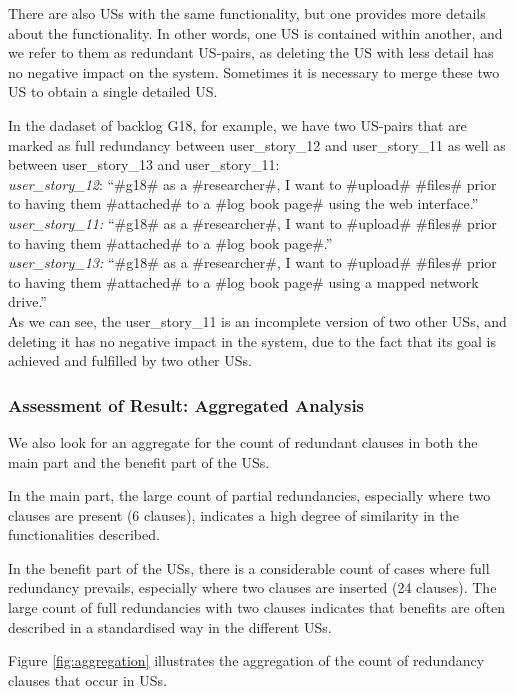 There are also USs with the same functionality, but one provides more details about the functionality. In other words, one US is contained within another, and we refer to them as 
redundant US-pairs, as deleting the US with less detail has no negative impact on the system. Sometimes it is necessary to merge these two US to obtain a single detailed US.
\begin{example}
In the dadaset of backlog G18, for example, we have two US-pairs that are marked as full redundancy between user\_story\_12 and user\_story\_11 as well as between user\_story\_13 and user\_story\_11:\\
\textit{user\_story\_12}: \enquote{\#g18\# as a \#researcher\#, I want to \#upload\# \#files\# prior to having them \#attached\# to a \#log book page\# using the web interface.}\\
\textit{user\_story\_11:} \enquote{\#g18\# as a \#researcher\#, I want to \#upload\# \#files\# prior to having them \#attached\# to a \#log book page\#.}\\
\textit{user\_story\_13:} \enquote{\#g18\# as a \#researcher\#, I want to \#upload\# \#files\# prior to having them \#attached\# to a \#log book page\# using a mapped network drive.}\\

As we can see, the user\_story\_11 is an incomplete version of two other USs, and deleting it has no negative impact in the system, due to the fact that its goal is achieved and fulfilled by two other USs.
\end{example}
\subsubsection*{Assessment of Result: Aggregated Analysis}
We also look for an aggregate for the count of redundant clauses in both the main part and the benefit part of the USs. 

In the main part, the large count of partial redundancies, especially where two clauses are present (6 clauses), indicates a high degree of similarity in the functionalities described.

In the benefit part of the USs, there is a considerable count of cases where full redundancy prevails, especially where two clauses are inserted (24 clauses). The large count of full redundancies with two clauses indicates that benefits are often described in a standardised way in the different USs.

Figure \ref{fig:aggregation} illustrates the aggregation of the count of redundancy clauses that occur in USs.

